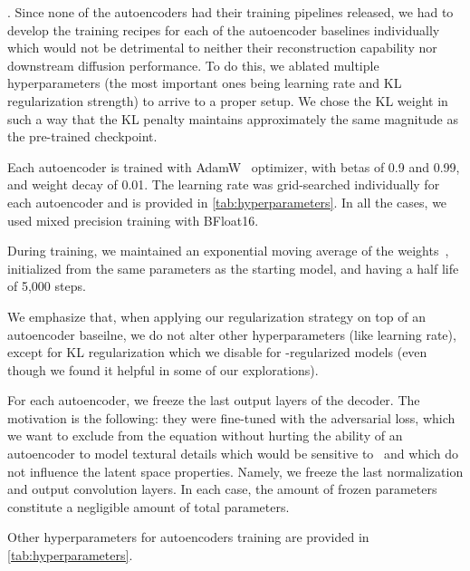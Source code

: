 .
Since none of the autoencoders had their training pipelines released, we had to develop the training recipes for each of the autoencoder baselines individually which would not be detrimental to neither their reconstruction capability nor downstream diffusion performance.
To do this, we ablated multiple hyperparameters (the most important ones being learning rate and KL regularization strength) to arrive to a proper setup.
We chose the KL weight in such a way that the KL penalty maintains approximately the same magnitude as the pre-trained checkpoint.

Each autoencoder is trained with AdamW~\cite{AdamW} optimizer, with betas of 0.9 and 0.99, and weight decay of 0.01.
The learning rate was grid-searched individually for each autoencoder and is provided in \cref{tab:hyperparameters}.
In all the cases, we used mixed precision training with BFloat16.

During training, we maintained an exponential moving average of the weights~\cite{EDMv2}, initialized from the same parameters as the starting model, and having a half life of 5,000 steps.

We emphasize that, when applying our regularization strategy on top of an autoencoder baseilne, we do not alter other hyperparameters (like learning rate), except for KL regularization which we disable for \regshortname-regularized models (even though we found it helpful in some of our explorations).

For each autoencoder, we freeze the last output layers of the decoder.
The motivation is the following: they were fine-tuned with the adversarial loss, which we want to exclude from the equation without hurting the ability of an autoencoder to model textural details which \fid would be sensitive to~\citep{LDM} and which do not influence the latent space properties.
Namely, we freeze the last normalization and output convolution layers.
In each case, the amount of frozen parameters constitute a negligible amount of total parameters.

Other hyperparameters for autoencoders training are provided in \cref{tab:hyperparameters}.


